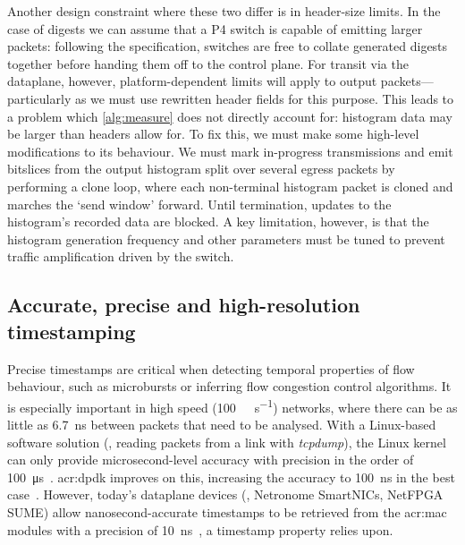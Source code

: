 Another design constraint where these two differ is in header-size limits.
In the case of digests we can assume that a P4 switch is capable of emitting larger packets: following the specification, switches are free to collate generated digests together before handing them off to the control plane.
For transit via the dataplane, however, platform-dependent limits will apply to output packets---particularly as we must use rewritten header fields for this purpose.
This leads to a problem which \cref{alg:measure} does not directly account for: histogram data may be larger than headers allow for.
To fix this, we must make some high-level modifications to its behaviour.
We must mark in-progress transmissions and emit bitslices from the output histogram split over several egress packets by performing a clone loop, where each non-terminal histogram packet is cloned and marches the `send window' forward.
Until termination, updates to the histogram's recorded data are blocked.
A key limitation, however, is that the histogram generation frequency and other parameters must be tuned to prevent traffic amplification driven by the switch.

\subsection{Accurate, precise and high-resolution timestamping}

Precise timestamps are critical when detecting temporal properties of flow behaviour, such as microbursts or inferring flow congestion control algorithms.
It is especially important in high speed (\qty{100}{\giga\bit\per\second}) networks, where there can be as little as \qty{6.7}{\nano\second} between packets that need to be analysed.
With a Linux-based software solution (\eg, reading packets from a link with \emph{tcpdump}), the Linux kernel can only provide microsecond-level accuracy with precision in the order of \qty{100}{\micro\second}~\parencite{DBLP:conf/noms/KundelSBRK20}.
\gls{acr:dpdk} improves on this, increasing the accuracy to \qty{100}{\nano\second} in the best case~\parencite{DBLP:journals/ccr/PrimoracBA17}.
However, today's dataplane devices (\eg, Netronome SmartNICs, NetFPGA SUME) allow nanosecond-accurate timestamps to be retrieved from the \gls{acr:mac} modules with a precision of \qty{10}{\nano\second}~\parencite{DBLP:conf/noms/KundelSBRK20}, a timestamp property \seidr{} relies upon.


